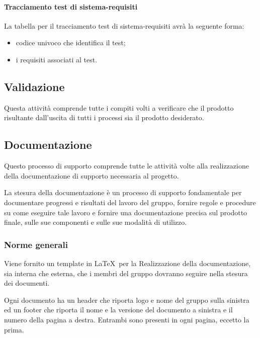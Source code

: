 \paragraph{Tracciamento test di sistema-requisiti}
La tabella per il tracciamento test di sistema-requisiti avrà la seguente forma:
\begin{itemize}
\item {}codice univoco che identifica il test;
\item {} i requisiti associati al test.
\end{itemize}

\subsection{Validazione}
Questa attività comprende tutte i compiti volti a verificare che il prodotto risultante dall'uscita di tutti i processi sia il prodotto desiderato.
 

\subsection{Documentazione}
Questo processo di supporto comprende tutte le attività volte alla realizzazione della documentazione di supporto necessaria al progetto.


La stesura della documentazione è un processo di supporto fondamentale per documentare progressi e risultati del lavoro del gruppo, fornire regole e procedure su come eseguire tale lavoro e fornire una documentazione precisa sul prodotto finale, sulle sue componenti e sulle sue modalità di utilizzo.
\subsubsection{Norme generali}


Viene fornito un template in \LaTeX\ per la Realizzazione della documentazione, sia interna che esterna, che i membri del gruppo dovranno seguire nella stesura dei documenti.

Ogni documento ha un header che riporta logo e nome del gruppo sulla sinistra ed un footer che riporta il nome e la versione del documento a sinistra e il numero della pagina a destra. Entrambi sono presenti in ogni pagina, eccetto la prima.


